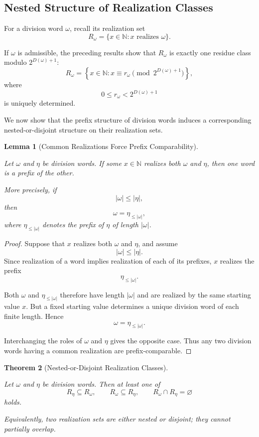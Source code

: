 \documentclass[12pt, oneside]{article}
\numberwithin{equation}{section}
\theoremstyle{definition}
\theoremstyle{plain}
\newtheorem{theorem}{Theorem}[section]
\newtheorem{lemma}[theorem]{Lemma}
\theoremstyle{remark}
\begin{document}
\subsection{Nested Structure of Realization Classes}

For a division word \(\omega\), recall its realization set
\[
R_\omega
=
\{x\in\mathbb N : x\text{ realizes }\omega\}.
\]

If \(\omega\) is admissible, the preceding results show that \(R_\omega\)
is exactly one residue class modulo \(2^{D(\omega)+1}\):
\[
R_\omega
=
\left\{
x\in\mathbb N :
x\equiv r_\omega
\pmod{2^{D(\omega)+1}}
\right\},
\]
where
\[
0\le r_\omega<2^{D(\omega)+1}
\]
is uniquely determined.

We now show that the prefix structure of division words induces a
corresponding nested-or-disjoint structure on their realization sets.

\begin{lemma}[Common Realizations Force Prefix Comparability]
\label{lem:common-realization-prefix}

Let \(\omega\) and \(\eta\) be division words. If some \(x\in\mathbb N\)
realizes both \(\omega\) and \(\eta\), then one word is a prefix of the
other.

More precisely, if
\[
|\omega|\le|\eta|,
\]
then
\[
\omega=\eta_{\le|\omega|},
\]
where \(\eta_{\le|\omega|}\) denotes the prefix of \(\eta\) of length
\(|\omega|\).
\end{lemma}

\begin{proof}
Suppose that \(x\) realizes both \(\omega\) and \(\eta\), and assume
\[
|\omega|\le|\eta|.
\]
Since realization of a word implies realization of each of its prefixes,
\(x\) realizes the prefix
\[
\eta_{\le|\omega|}.
\]

Both \(\omega\) and \(\eta_{\le|\omega|}\) therefore have length
\(|\omega|\) and are realized by the same starting value \(x\). But a
fixed starting value determines a unique division word of each finite
length. Hence
\[
\omega=\eta_{\le|\omega|}.
\]

Interchanging the roles of \(\omega\) and \(\eta\) gives the opposite
case. Thus any two division words having a common realization are
prefix-comparable.
\end{proof}

\begin{theorem}[Nested-or-Disjoint Realization Classes]
\label{thm:realization-classes-nested-disjoint}

Let \(\omega\) and \(\eta\) be division words. Then at least one of
\[
R_\eta\subseteq R_\omega,
\qquad
R_\omega\subseteq R_\eta,
\qquad
R_\omega\cap R_\eta=\varnothing
\]
holds.

Equivalently, two realization sets are either nested or disjoint; they
cannot partially overlap.
\end{theorem}
\end{document}
